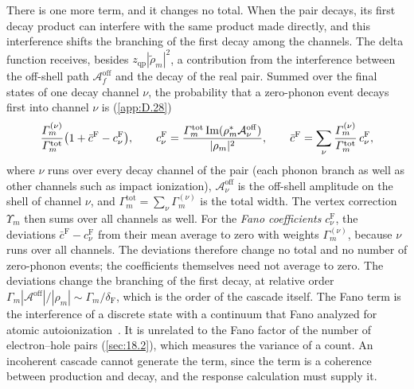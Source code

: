 There is one more term, and it changes no total. When the pair decays, its first decay product can interfere with the same product made directly, and this interference shifts the branching of the first decay among the channels. The delta function receives, besides $z_{\mathrm{qp}}|\tilde\rho_m|^2$, a contribution from the interference between the off-shell path $\mathcal{A}^{\mathrm{off}}_f$ and the decay of the real pair. Summed over the final states of one decay channel $\nu$, the probability that a zero-phonon event decays first into channel $\nu$ is (\cref{app:D.28})
\begin{equation}
  \frac{\varGamma^{(\nu)}_m}{\varGamma^{\mathrm{tot}}_m}\bigl(1 + \bar c^{\mathrm{F}} - c^{\mathrm{F}}_\nu\bigr) , \qquad
  c^{\mathrm{F}}_\nu = \frac{\varGamma^{\mathrm{tot}}_m\operatorname{Im}(\rho_m^*\mathcal{A}^{\mathrm{off}}_\nu)}{|\rho_m|^2} , \qquad
  \bar c^{\mathrm{F}} = \sum_\nu\frac{\varGamma^{(\nu)}_m}{\varGamma^{\mathrm{tot}}_m}\,c^{\mathrm{F}}_\nu ,
  \label{eq:8.6-fano}
\end{equation}
where $\nu$ runs over every decay channel of the pair (each phonon branch as well as other channels such as impact ionization), $\mathcal{A}^{\mathrm{off}}_\nu$ is the off-shell amplitude on the shell of channel $\nu$, and $\varGamma^{\mathrm{tot}}_m = \sum_\nu\varGamma^{(\nu)}_m$ is the total width. The vertex correction $\Upsilon_m$ then sums over all channels as well. For the \emph{Fano coefficients} $c^{\mathrm{F}}_\nu$, the deviations $\bar c^{\mathrm{F}} - c^{\mathrm{F}}_\nu$ from their mean average to zero with weights $\varGamma^{(\nu)}_m$, because $\nu$ runs over all channels. The deviations therefore change no total and no number of zero-phonon events; the coefficients themselves need not average to zero. The deviations change the branching of the first decay, at relative order $\varGamma_m|\mathcal{A}^{\mathrm{off}}|/|\rho_m| \sim \varGamma_m/\delta_{\mathrm{F}}$, which is the order of the cascade itself. The Fano term is the interference of a discrete state with a continuum that Fano analyzed for atomic autoionization~\cite{fano1961effects}. It is unrelated to the Fano factor of the number of electron--hole pairs (\cref{sec:18.2}), which measures the variance of a count. An incoherent cascade cannot generate the term, since the term is a coherence between production and decay, and the response calculation must supply it.

